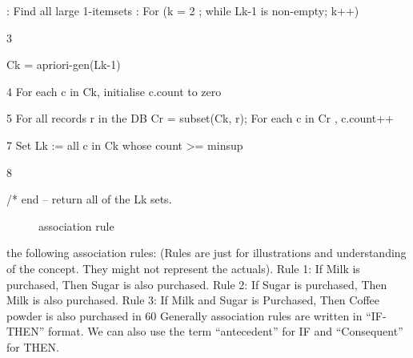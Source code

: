 \documentclass[a4paper,12pt]{article}
\begin{document}
{{:  Find all large 1-itemsets
:  For (k = 2 ; while Lk-1 is non-empty; k++)
\newline

3		{Ck = apriori-gen(Lk-1)
\newline

	4          For each c in Ck, initialise c.count to zero 
\newline

	5          For all records r in the DB
	{Cr = subset(Ck, r);  For each c in Cr , c.count++ }
\newline

	7             Set Lk := all c in Ck whose count >=  minsup
\newline

	8         }  /*  end   -- return all of the Lk sets.


\begin{center}
	\begin{figure}[!htbp]
		\centering
		\caption{association rule}
		\label{fig:usecase}
	\end{figure}
\end{center}  

the following association rules: (Rules are just for illustrations and understanding of the concept. They might not represent the actuals).
\newline
Rule 1: If Milk is purchased, Then Sugar is also purchased.
\newline
Rule 2:  If Sugar is purchased, Then Milk is also purchased.
\newline
Rule 3: If Milk and Sugar is Purchased, Then Coffee powder is also purchased in 60%
\newline
Generally association rules are written in “IF-THEN” format. We can also use the term “antecedent” for IF and “Consequent” for THEN.


}}
\end{document}
